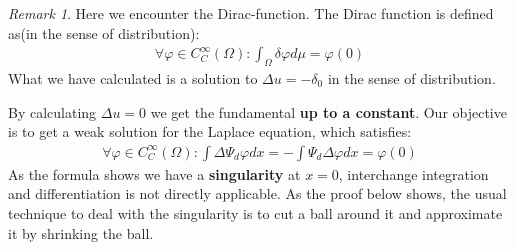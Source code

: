\documentclass[a4paper,11pt,oneside,fleqn]{book}
\theoremstyle{definition}
\theoremstyle{remark}
\newtheorem*{remark}{Remark}
\begin{document}
\begin{remark}
Here we encounter the Dirac-function. The Dirac function is defined as(in the sense of distribution):
\begin{align*}
	\forall \varphi \in C_C^\infty(\Omega): \int_\Omega \delta \varphi d\mu = \varphi(0)
\end{align*}	
What we have calculated is a solution to $\Delta u = -\delta_0$ in the sense of distribution.
\end{remark}
By calculating $\Delta u = 0$ we get the fundamental \textbf{up to a constant}. Our objective is to get a weak solution for the Laplace equation, which satisfies:
\begin{align*}
		\forall \varphi \in C_C^\infty(\Omega): \int \Delta \Psi_d \varphi dx =   -\int \Psi_d \Delta \varphi dx = \varphi(0)	
\end{align*}
As the formula shows we have a \textbf{singularity} at $x = 0$, interchange integration and differentiation is not directly applicable. As the proof below shows, the usual technique to deal with the singularity is to cut a ball around it and approximate it by shrinking the ball. 
\end{document}
